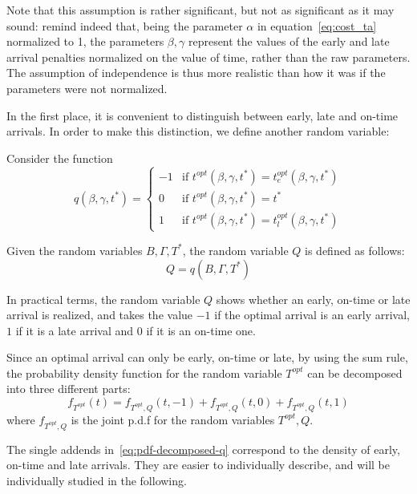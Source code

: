 Note that this assumption is rather significant,
but not as significant as it may sound:
remind indeed that, being the parameter \(\alpha\) in equation~\eqref{eq:cost_ta} normalized to 1,
the parameters \(\beta, \gamma\) represent the values of the early and late arrival penalties normalized on the value of time,
rather than the raw parameters.
The assumption of independence is thus more realistic than how it was if the parameters were not normalized.

In the first place,
 it is convenient to distinguish between early, late and on-time arrivals.
In order to make this distinction, we define another random variable:
\begin{definition}
  Consider the function
  \begin{equation*}
    q(\beta, \gamma, t^*) =
    \begin{cases}
      -1 & \text{if } t^{opt}(\beta, \gamma, t^*) = t_e^{opt}(\beta, \gamma, t^*) \\
      0 & \text{if } t^{opt}(\beta, \gamma, t^*) = t^* \\
      1 & \text{if } t^{opt}(\beta, \gamma, t^*) = t_l^{opt}(\beta, \gamma, t^*)
    \end{cases}
  \end{equation*}

  Given the random variables \(B, \Gamma, T^*\), the random variable \(Q\) is defined as follows:
  \begin{equation*}
    Q  = q(B, \Gamma, T^*)
  \end{equation*}
\end{definition}

In practical terms, the random variable \(Q\) shows whether an early, on-time or late arrival is realized,
and takes the value \(-1\) if the optimal arrival is an early arrival,
\(1\) if it is a late arrival and \(0\) if it is an on-time one.

Since an optimal arrival can only be early, on-time or late,
by using the sum rule,
the probability density function for the random variable \(T^{opt}\) can be decomposed into three different parts:
\begin{equation}
  \label{eq:pdf-decomposed-q}
  f_{T^{opt}}(t) = f_{T^{opt}, Q}(t, -1) + f_{T^{opt}, Q}(t, 0) + f_{T^{opt}, Q}(t, 1)
\end{equation}
where \(f_{T^{opt}, Q}\) is the joint p.d.f for the random variables \(T^{opt}, Q\).

The single addends in~\eqref{eq:pdf-decomposed-q}
correspond to the density of early, on-time and late arrivals.
They are easier to individually describe,
and will be individually studied in the following.

